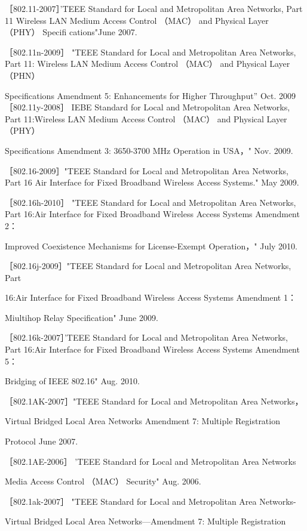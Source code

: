 ［802.11-2007］'TEEE Standard for Local and Metropolitan Area Networks, Part 11
Wireless LAN Medium Access Control （MAC） and Physical Layer （PHY） Specifi
cations"June 2007.

［802.11n-2009］ "TEEE Standard for Local and Metropolitan Area Networks, Part
11: Wireless LAN Medium Access Control （MAC） and Physical Layer （PHN）

Specifications Amendment 5: Enhancements for Higher Throughput” Oct. 2009
［802.11y-2008］ IEBE Standard for Local and Metropolitan Area Networks, Part
11:Wireless LAN Medium Access Control （MAC） and Physical Layer （PHY）

Specifications Amendment 3: 3650-3700 MHz Operation in USA，" Nov. 2009.

［802.16-2009］"TEEE Standard for Local and Metropolitan Area Networks, Part 16
Air Interface for Fixed Broadband Wireless Access Systems." May 2009.

［802.16h-2010］ "TEEE Standard for Local and Metropolitan Area Networks, Part
16:Air Interface for Fixed Broadband Wireless Access Systems Amendment 2：

Improved Coexistence Mechanisms for License-Exempt Operation，" July 2010.

［802.16j-2009］"TEEE Standard for Local and Metropolitan Area Networks, Part

16:Air Interface for Fixed Broadband Wireless Access Systems Amendment 1：

Miultihop Relay Specification" June 2009.

［802.16k-2007］'TEEE Standard for Local and Metropolitan Area Networks, Part
16:Air Interface for Fixed Broadband Wireless Access Systems Amendment 5：

Bridging of IEEE 802.16" Aug. 2010.

［802.1AK-2007］"TEEE Standard for Local and Metropolitan Area Networks，

Virtual Bridged Local Area Networks Amendment 7: Multiple Registration

Protocol June 2007.

［802.1AE-2006］ 'TEEE Standard for Local and Metropolitan Area Networks

Media Access Control （MAC） Security" Aug. 2006.

［802.1ak-2007］ "TEEE Standard for Local and Metropolitan Area Networks-

Virtual Bridged Local Area Networks—Amendment 7: Multiple Registration

